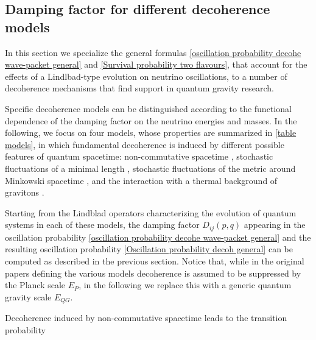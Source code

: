 \documentclass[11pt]{article}
\begin{document}
\subsection{Damping factor for different decoherence models}\label{decoherence models}

In this section we specialize the general formulas \eqref{oscillation probability decohe wave-packet general} and \eqref{Survival probability two flavours},  that account for the effects of a Lindlbad-type evolution on neutrino oscillations, 
to a number of decoherence mechanisms that find support in quantum gravity research. 

Specific decoherence  models can be distinguished according to the  functional dependence of the damping factor on the neutrino energies and masses.
In the following, we focus on four models, whose properties are summarized in \cref{table models}, in which fundamental decoherence is induced by different possible features of quantum spacetime: non-commutative spacetime \cite{Arzano:2022nlo}, stochastic fluctuations of a minimal length \cite{Petruzziello:2020wkd}, stochastic fluctuations of the metric around Minkowski spacetime \cite{Breuer:2008rh}, and the interaction with a thermal background of gravitons \cite{Blencowe:2012mp}.

Starting from the Lindblad operators characterizing the evolution of quantum systems in each of these models, the damping factor $D_{ij}(p,q)$ appearing in the oscillation probability \eqref{oscillation probability decohe wave-packet general} and the resulting oscillation probability \eqref{Oscillation probability decoh general} can be computed as described in the previous section. Notice that, while in the original papers defining the various models decoherence is assumed to be suppressed by the Planck scale $E_P$, in the following we replace this with a generic quantum gravity scale $E_{QG}$.

Decoherence induced by non-commutative spacetime \cite{Arzano:2022nlo} leads to the transition probability 
\end{document}
